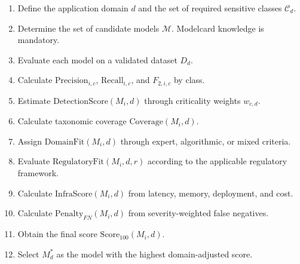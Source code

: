 \documentclass[11pt,a4paper]{article}
\begin{document}
\begin{enumerate}
    \item Define the application domain $d$ and the set of required sensitive classes $\mathcal{C}_d$.
    \item Determine the set of candidate models $\mathcal{M}$. Modelcard knowledge is mandatory.
    \item Evaluate each model on a validated dataset $D_d$.
    \item Calculate $\mathrm{Precision}_{i,c}$, $\mathrm{Recall}_{i,c}$, and $F_{2,i,c}$ by class.
    \item Estimate $\mathrm{DetectionScore}(M_i,d)$ through criticality weights $w_{c,d}$.
    \item Calculate taxonomic coverage $\mathrm{Coverage}(M_i,d)$.
    \item Assign $\mathrm{DomainFit}(M_i,d)$ through expert, algorithmic, or mixed criteria.
    \item Evaluate $\mathrm{RegulatoryFit}(M_i,d,r)$ according to the applicable regulatory framework.
    \item Calculate $\mathrm{InfraScore}(M_i,d)$ from latency, memory, deployment, and cost.
    \item Calculate $\mathrm{Penalty}_{FN}(M_i,d)$ from severity-weighted false negatives.
    \item Obtain the final score $\mathrm{Score}_{100}(M_i,d)$.
    \item Select $M_d^*$ as the model with the highest domain-adjusted score.
\end{enumerate}

\begin{algorithm}[h!]
\caption{Domain-adjusted model selection}
\begin{algorithmic}[1]
\REQUIRE Set of candidate models $\mathcal{M}$, domain $d$, validated dataset $D_d$, taxonomy $\mathcal{C}_d$, and regulatory framework $r$.
\ENSURE Optimal model $M_d^*$ and scores $\mathrm{Score}_{100}(M_i,d)$.
    \STATE Evaluate $M_i$ on $D_d$.
    \STATE Calculate $\mathrm{Precision}_{i,c}$, $\mathrm{Recall}_{i,c}$, and $F_{2,i,c}$ for each $c\in\mathcal{C}_d}$.
    \STATE Calculate $\mathrm{DetectionScore}(M_i,d)$.
    \STATE Calculate $\mathrm{Coverage}(M_i,d)$.
    \STATE Assign $\mathrm{DomainFit}(M_i,d)$.
    \STATE Calculate $\mathrm{RegulatoryFit}(M_i,d,r)$.
    \STATE Calculate $\mathrm{Penalty}_{FN}(M_i,d)$.
    \STATE Calculate $\mathrm{Score}_{100}(M_i,d)$.
\ENDFOR
\STATE $M_d^*\leftarrow \arg\max_{M_i\in\mathcal{M}}\mathrm{Score}(M_i,d)$.
\RETURN $M_d^*$ and the associated scores.
\end{algorithmic}
\end{algorithm}
\end{document}
